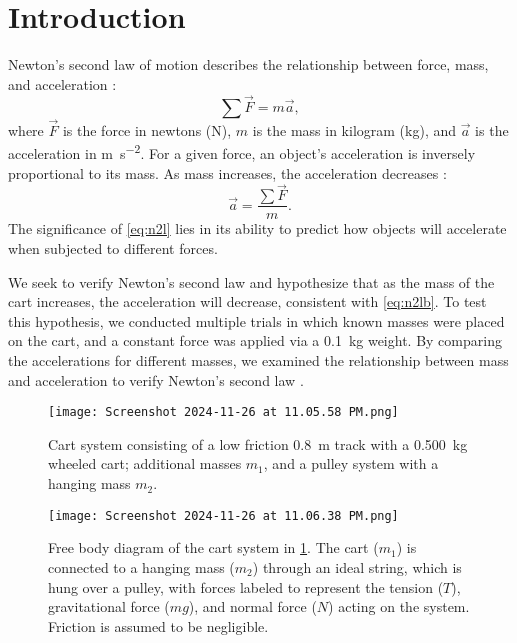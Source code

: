 ﻿\documentclass[reprint,amsmath,amssymb,prl]{revtex4-2}
\begin{document}
\section{Introduction}
Newton’s second law of motion describes the relationship between force, mass, and acceleration \cite{knight2017physics}: 
\begin{equation}
\sum \vec{F} = m \vec{a},
\label{eq:n2l}
\end{equation}
where $\vec{F}$ is the force in newtons (\unit{\newton}), $m$ is the mass in kilogram (\unit{\kilo\gram}), and $\vec{a}$ is the acceleration in \unit{\meter\per\second\squared}. For a given force, an object’s acceleration is inversely proportional to its mass. As mass increases, the acceleration decreases \cite{knight2017physics}:   
\begin{equation}
\vec{a} = \dfrac{\sum \vec{F}}{m}.
\label{eq:n2lb}
\end{equation}
The significance of \cref{eq:n2l} lies in its ability to predict how objects will accelerate when subjected to different forces. 

We seek to verify Newton’s second law and hypothesize that as the mass of the cart increases, the acceleration will decrease, consistent with \cref{eq:n2lb}. To test this hypothesis, we conducted multiple trials in which known masses were placed on the cart, and a constant force was applied via a \qty{0.1}{\kilo\gram} weight. By comparing the accelerations for different masses, we examined the relationship between mass and acceleration to verify Newton’s second law \cite{knight2017physics}.

\begin{figure}
\begin{center}
\texttt{[image: Screenshot 2024-11-26 at 11.05.58 PM.png]}
\end{center}
\caption{\label{fig:materials} Cart system consisting of a low friction \qty{0.8}{\meter} track with a \qty{0.500}{\kilo\gram} wheeled cart; additional masses $m_1$, and a pulley system with a hanging mass $m_2$.}
\end{figure}

\begin{figure}
\begin{center}
\texttt{[image: Screenshot 2024-11-26 at 11.06.38 PM.png]}
\end{center}
\caption{\label{fig:fbd} Free body diagram of the cart system in \cref{fig:materials}. The cart ($m_1$) is connected to a hanging mass ($m_2$) through an ideal string, which is hung over a pulley, with forces labeled to represent the tension ($T$), gravitational force ($mg$), and normal force ($N$) acting on the system. Friction is assumed to be negligible.}
\end{figure}
\end{document}
